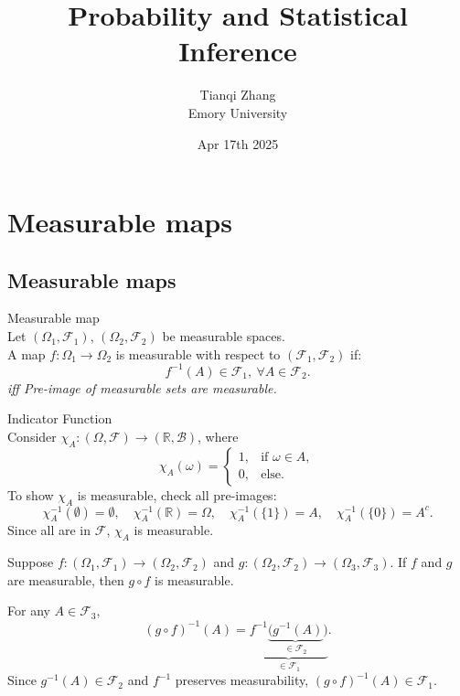 

\title{\textbf{%
               Probability and Statistical Inference}}
\author{Tianqi Zhang\\
Emory University}
\date{Apr 17th 2025}


\maketitle
\setcounter{tocdepth}{1} %
\setcounter{section}{5}


\section{Measurable maps}
\subsection{Measurable maps}
\begin{df}{Measurable map}\\
Let \( (\Omega_1, \mathscr{F}_1) \), \( (\Omega_2, \mathscr{F}_2) \) be measurable spaces. \\
A map \( f: \Omega_1 \to \Omega_2 \) is measurable with respect to \( (\mathscr{F}_1, \mathscr{F}_2) \) if:
\[
f^{-1}(A) \in \mathscr{F}_1, \ \forall A \in \mathscr{F}_2.
\]
\noindent \textit{iff Pre-image of measurable sets are measurable.}
\end{df}

\begin{eg}{Indicator Function}\\
\noindent Consider \( \chi_A: (\Omega, \mathscr{F}) \to (\mathbb{R}, \mathscr{B}) \), where
\[
\chi_A(\omega) =
\begin{cases}
1, & \text{if } \omega \in A, \\
0, & \text{else}.
\end{cases}
\]
To show \( \chi_A \) is measurable, check all pre-images:
\[
\chi_A^{-1}(\emptyset) = \emptyset, \quad \chi_A^{-1}(\mathbb{R}) = \Omega, \quad \chi_A^{-1}(\{1\}) = A, \quad \chi_A^{-1}(\{0\}) = A^c.
\]
Since all are in \( \mathscr{F} \), \( \chi_A \) is measurable.

\end{eg}

\begin{eg}{}
\noindent Suppose \( f: (\Omega_1,\mathscr{F}_1)  \to (\Omega_2, \mathscr{F}_2) \) and \( g: (\Omega_2, \mathscr{F}_2) \to (\Omega_3, \mathscr{F}_3) \). If \( f \) and \( g \) are measurable, then \( g \circ f \) is measurable.

\noindent For any \( A \in \mathscr{F}_3 \),
\[
(g \circ f)^{-1}(A) = \underbrace{f^{-1}\underbrace{(g^{-1}(A)}_{\in \mathscr{F}_2})}_{\in\mathscr{F}_1}.
\]
Since \( g^{-1}(A) \in \mathscr{F}_2 \) and \( f^{-1} \) preserves measurability, \( (g \circ f)^{-1}(A) \in \mathscr{F}_1 \).
\end{eg}


